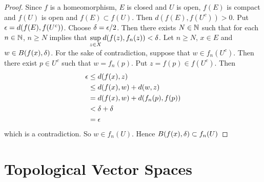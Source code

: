 \documentclass{book}
\begin{document}
\begin{proof}
	Since $f$ is a homeomorphism, $E$ is closed and $U$ is open, $f(E)$ is compact and $f(U)$ is open and $f(E) \subset f(U)$. Then $d(f(E), f(U^c)) >0$. Put $\epsilon = d(f(E), f(U^c))$. Choose $\delta = \epsilon/2$. Then there exists $N \in \mathbb{N}$ such that for each $n \in \mathbb{N}$, $n \geq N$ implies that $\sup\limits_{z \in X} d(f(z), f_n(z)) < \delta$. Let $n \geq N$, $x \in E$ and $w \in B(f(x), \delta)$. For the sake of contradiction, suppose that $w \in f_n(U^c)$. Then there exist $p \in U^c$ such that $w = f_n(p)$. Put $z = f(p) \in f(U^c)$. Then 
	\begin{align*}
		\epsilon 
		&\leq d(f(x), z) \\ 
		&\leq d(f(x), w) + d(w, z) \\
		& = d(f(x), w) + d(f_n(p), f(p))  \\
		& < \delta + \delta \\
		& = \epsilon
	\end{align*}
	which is a contradiction. So $w \in f_n(U)$. Hence $B(f(x), \delta) \subset f_n(U)$
\end{proof}
































































	\newpage
	\chapter{Topological Vector Spaces}
	
\end{document}
